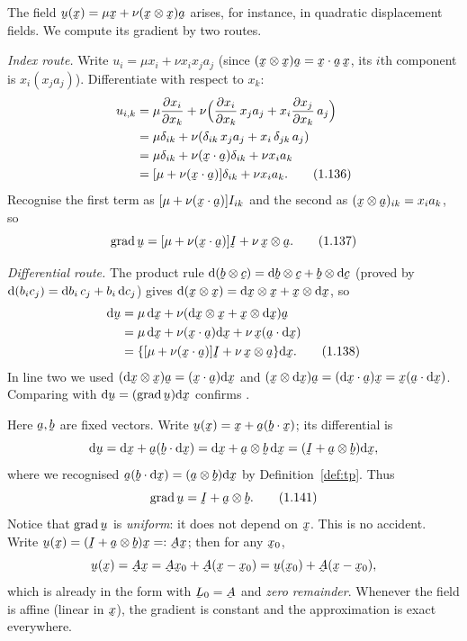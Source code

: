 \begin{example}[$\bu=\mu\bx+\nu(\bx\otimes\bx)\ba$]\label{ex:gu1}
The field $\bu(\bx)=\mu\bx+\nu(\bx\otimes\bx)\ba$ arises, for instance,
in quadratic displacement fields. We compute its gradient by two routes.

\emph{Index route.} Write $u_i=\mu x_i+\nu x_ix_ja_j$ (since
$(\bx\otimes\bx)\ba=\ip\bx\ba\,\bx$, its $i$th component is
$x_i(x_ja_j)$). Differentiate with respect to $x_k$:
\begin{align}
u_{i,k}&=\mu\frac{\partial x_i}{\partial x_k}
+\nu\Big(\frac{\partial x_i}{\partial x_k}\,x_ja_j
+x_i\frac{\partial x_j}{\partial x_k}\,a_j\Big)\notag\\
&=\mu\dd_{ik}+\nu(\dd_{ik}\,x_ja_j+x_i\,\dd_{jk}\,a_j)\notag\\
&=\mu\dd_{ik}+\nu(\ip\bx\ba)\dd_{ik}+\nu x_ia_k\notag\\
&=[\mu+\nu(\ip\bx\ba)]\dd_{ik}+\nu x_ia_k. \tag{1.136}\label{eq:1.136}
\end{align}
Recognise the first term as $[\mu+\nu(\ip\bx\ba)]I_{ik}$ and the second
as $(\bx\otimes\ba)_{ik}=x_ia_k$, so
\begin{equation}
\grad\bu=[\mu+\nu(\ip\bx\ba)]\I+\nu\,\bx\otimes\ba. \tag{1.137}\label{eq:1.137}
\end{equation}

\emph{Differential route.} The product rule
$\dl(\bb\otimes\bc)=\dl\bb\otimes\bc+\bb\otimes\dl\bc$ (proved by
$\mathrm{d}(b_ic_j)=\mathrm{d} b_i\,c_j+b_i\,\mathrm{d} c_j$) gives
$\dl(\bx\otimes\bx)=\dl\bx\otimes\bx+\bx\otimes\dl\bx$, so
\begin{align}
\dl\bu&=\mu\,\dl\bx+\nu(\dl\bx\otimes\bx+\bx\otimes\dl\bx)\ba\notag\\
&=\mu\,\dl\bx+\nu(\ip\bx\ba)\dl\bx+\nu\,\bx(\ip\ba{\dl\bx})\notag\\
&=\{[\mu+\nu(\ip\bx\ba)]\I+\nu\,\bx\otimes\ba\}\dl\bx. \tag{1.138}\label{eq:1.138}
\end{align}
In line two we used
$(\dl\bx\otimes\bx)\ba=(\ip\bx\ba)\dl\bx$ and
$(\bx\otimes\dl\bx)\ba=(\ip{\dl\bx}\ba)\bx=\bx(\ip\ba{\dl\bx})$.
Comparing with $\dl\bu=(\grad\bu)\dl\bx$ confirms .
\end{example}

\begin{example}[affine field $\bu=\bx+(\ip\bb\bx)\ba$]\label{ex:gu2}
Here $\ba,\bb$ are fixed vectors. Write
$\bu(\bx)=\bx+\ba(\ip\bb\bx)$; its differential is
\[
\dl\bu=\dl\bx+\ba(\ip\bb{\dl\bx})=\dl\bx+\ba\otimes\bb\,\dl\bx
=(\I+\ba\otimes\bb)\dl\bx,
\]
where we recognised $\ba(\ip\bb{\dl\bx})=(\ba\otimes\bb)\dl\bx$ by
Definition~\ref{def:tp}. Thus
\begin{equation}
\grad\bu=\I+\ba\otimes\bb. \tag{1.141}\label{eq:1.141}
\end{equation}
Notice that $\grad\bu$ is \emph{uniform}: it does not depend on $\bx$.
This is no accident. Write $\bu(\bx)=(\I+\ba\otimes\bb)\bx=:\bA\bx$;
then for any $\bx_0$,
\[
\bu(\bx)=\bA\bx=\bA\bx_0+\bA(\bx-\bx_0)=\bu(\bx_0)+\bA(\bx-\bx_0),
\]
which is already in the form  with $\bL_0=\bA$ and \emph{zero
remainder}. Whenever the field is affine (linear in $\bx$), the gradient
is constant and the approximation  is exact everywhere.
\end{example}

